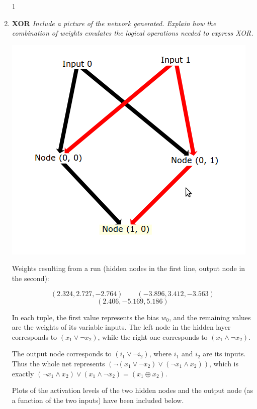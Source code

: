 \documentclass{article}
\begin{document}
  \begin{enumerate}

    \setcounter{enumi}1
  \item \textbf{XOR} \textit{Include a picture of the network
    generated. Explain how the combination of weights emulates the
    logical operations needed to express XOR.}

    \begin{center}
      \includegraphics[scale=.4]{xor_net.png}
    \end{center}

    Weights resulting from a run (hidden nodes in the first line,
    output node in the second):

    \[(2.324, 2.727, -2.764)\qquad(-3.896, 3.412, -3.563)\]
    \[(2.406, -5.169, 5.186)\]

    In each tuple, the first value represents the bias $w_0$, and the
    remaining values are the weights of its variable inputs. The left
    node in the hidden layer corresponds to $(x_1\vee\lnot x_2)$,
    while the right one corresponds to $(x_1\wedge\lnot x_2)$.

    The output node corresponds to $(i_1\vee\lnot i_2)$, where $i_1$
    and $i_2$ are its inputs. Thus the whole net represents
    $(\lnot(x_1\vee\lnot x_2)\vee(\lnot x_1\wedge x_2))$, which is
    exactly $(\lnot x_1\wedge x_2)\vee(x_1\wedge \lnot x_2)=(x_1\oplus x_2)$.

    Plots of the activation levels of the two hidden nodes and the
    output node (as a function of the two inputs) have been included
    below.


\end{enumerate}
\end{document}
